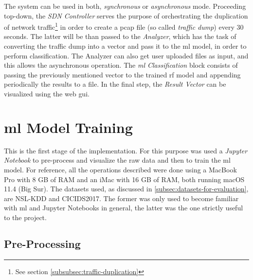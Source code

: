 \noindent The system can be used in both, \textit{synchronous} or \textit{asynchronous} mode. Proceeding top-down, the \textit{SDN Controller} serves the purpose of orchestrating the duplication of network traffic\footnote{See section \ref{subsubsec:traffic-duplication}} in order to create a \gls{pcap} file (so called \textit{traffic dump}) every 30 seconds. The latter will be than passed to the \textit{Analyzer}, which has the task of converting the traffic dump into a vector and pass it to the \gls{ml} model, in order to perform classification. The Analyzer can also get user uploaded files as input, and this allows the asynchronous operation. The \textit{\gls{ml} Classification} block consists of passing the previously mentioned vector to the trained \gls{rf} model and appending periodically the results to a  file. In the final step, the \textit{Result Vector} can be visualized using the web \gls{gui}.


\section{\gls{ml} Model Training}
\label{sec:model-training}

This is the first stage of the implementation. For this purpose was used a \textit{Jupyter Notebook} to pre-process and visualize the raw data and then to train the \gls{ml} model. For reference, all the operations described were done using a MacBook Pro with 8 GB of RAM and an iMac with 16 GB of RAM, both running macOS 11.4 (Big Sur). The datasets used, as discussed in \ref{subsec:datasets-for-evaluation}, are NSL-KDD and CICIDS2017. The former was only used to become familiar with \gls{ml} and Jupyter Notebooks in general, the latter was the one strictly useful to the project.


\subsection{Pre-Processing}
\label{subsec:pre-processing}

